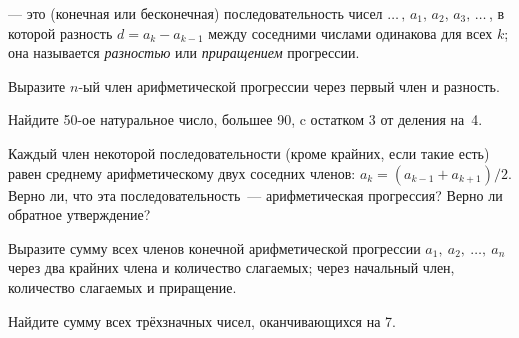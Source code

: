 \documentclass[a4paper,12pt]{article}
\begin{document}





\vspace*{.5truemm}


  --- это (конечная или бесконечная)
последовательность чисел $\ldots\,,\,a_1,\,a_2,\,a_3,\,\ldots\,$,
в которой разность $d=a_k-a_{k-1}$ между соседними числами
одинакова для всех $k$; она называется {\it разностью\/} или {\it
приращением\/} прогрессии.

Выразите $n$-ый член арифметической прогрессии через
первый член и разность.

Найдите 50-ое натуральное число, большее 90, c остатком 3 от деления на~4.


 Каждый член некоторой последовательности (кроме крайних, если
такие есть) равен среднему арифметическому двух соседних членов:
$a_k=(a_{k-1}+a_{k+1})/2$. Верно ли, что эта последовательность~--- арифметическая прогрессия?
Верно ли обратное утверждение?






Выразите сумму всех членов конечной арифметической
прогрессии $a_1,\ \!a_2,\ \!\ldots,\ \!a_n$
 через два крайних члена и количество слагаемых;
 через начальный член, количество слагаемых и приращение.

Найдите сумму всех тр\"ехзначных чисел, оканчивающихся на 7.
\end{document}

